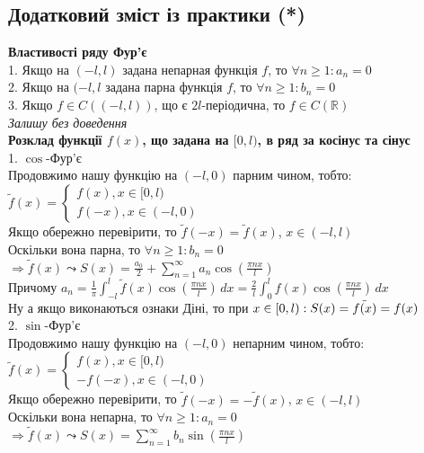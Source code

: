 \documentclass[a4paper, 14pt]{extarticle}
\def\hugespace{\vspace{5mm} \\}
\begin{document}
\subsection{Додатковий зміст із практики (*)}
\textbf{Властивості ряду Фур'є}\\
1. Якщо на $(-l,l)$ задана непарная функція $f$, то $\forall n \geq 1: a_n = 0$\\
2. Якщо на $(-l,l$ задана парна функція $f$, то $\forall n \geq 1: b_n = 0$\\
3. Якщо $f \in C((-l,l))$, що є $2l$-періодична, то $f \in C(\mathbb{R})$\\
\textit{Залишу без доведення}
\hugespace
\textbf{Розклад функції $f(x)$, що задана на $[0,l)$, в ряд за косінус та сінус}\\
1. $\cos$-Фур'є\\
Продовжимо нашу функцію на $(-l,0)$ парним чином, тобто:\\
$\tilde{f}(x) = \begin{cases} f(x), x \in [0,l) \\ f(-x), x \in (-l,0) \end{cases}$\\
Якщо обережно перевірити, то $\tilde{f}(-x)=\tilde{f}(x)$, $x \in (-l,l)$\\
Оскільки вона парна, то $\forall n \geq 1: b_n = 0$\\
$\Rightarrow \tilde{f}(x) \leadsto S(x) = \displaystyle \frac{a_0}{2} + \sum_{n=1}^{\infty} a_n \cos \left( \frac{\pi n x}{l} \right)$\\
Причому $a_n = \displaystyle \frac{1}{\pi} \int_{-l}^{l} \tilde{f}(x) \cos \left( \frac{\pi n x}{l} \right) \,dx = \frac{2}{l} \int_0^l f(x) \cos \left( \frac{\pi n x}{l} \right)\,dx$\\
Ну а якщо виконаються ознаки Діні, то при $x \in [0,l): \\ S(x) = \tilde{f(x)} = f(x)$
\hugespace
2. $\sin$-Фур'є\\
Продовжимо нашу функцію на $(-l,0)$ непарним чином, тобто:\\
$\tilde{f}(x) = \begin{cases} f(x), x \in [0,l) \\ -f(-x), x \in (-l,0) \end{cases}$\\
Якщо обережно перевірити, то $\tilde{f}(-x)=-\tilde{f}(x)$, $x \in (-l,l)$\\
Оскільки вона непарна, то $\forall n \geq 1: a_n = 0$\\
$\Rightarrow \tilde{f}(x) \leadsto S(x) = \displaystyle \sum_{n=1}^{\infty} b_n \sin \left( \frac{\pi n x}{l} \right)$\\
\end{document}
